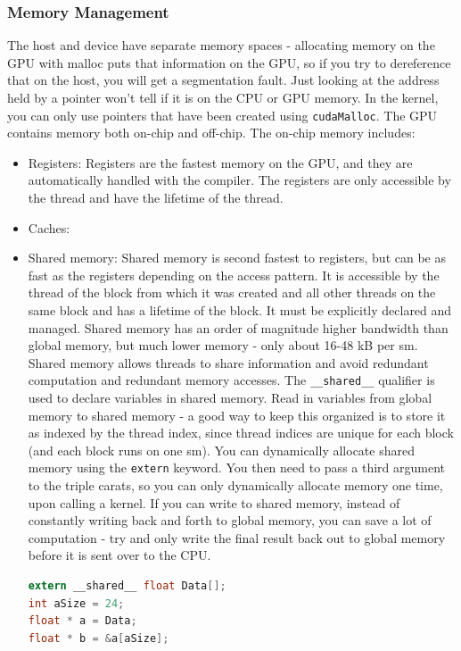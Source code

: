 \documentclass[10pt]{article}
\begin{document}
\begin{flushleft}
\subsubsection{Memory Management}

The host and device have separate memory spaces - allocating memory on the GPU with malloc puts that information on the GPU, so if you try to dereference that on the host, you will get a segmentation fault. Just looking at the address held by a pointer won't tell if it is on the CPU or GPU memory. In the kernel, you can only use pointers that have been created using {\tt cudaMalloc}. The GPU contains memory both on-chip and off-chip. The on-chip memory includes:

\begin{itemize}
\item Registers: Registers are the fastest memory on the GPU, and they are automatically handled with the compiler. The registers are only accessible by the thread and have the lifetime of the thread.
\item Caches:
\item Shared memory: Shared memory is second fastest to registers, but can be as fast as the registers depending on the access pattern. It is accessible by the thread of the block from which it was created and all other threads on the same block and has a lifetime of the block. It must be explicitly declared and managed. Shared memory has an order of magnitude higher bandwidth than global memory, but much lower memory - only about 16-48 kB per \gls{sm}. Shared memory allows threads to share information and avoid redundant computation and redundant memory accesses. The {\tt \_\_shared\_\_} qualifier is used to declare variables in shared memory. Read in variables from global memory to shared memory - a good way to keep this organized is to store it as indexed by the thread index, since thread indices are unique for each block (and each block runs on one \gls{sm}). You can dynamically allocate shared memory using the {\tt extern} keyword. You then need to pass a third argument to the triple carats, so you can only dynamically allocate memory one time, upon calling a kernel. If you can write to shared memory, instead of constantly writing back and forth to global memory, you can save a lot of computation - try and only write the final result back out to global memory before it is sent over to the CPU. 

\begin{lstlisting}[language=C]
extern __shared__ float Data[];
int aSize = 24;
float * a = Data;
float * b = &a[aSize];
\end{lstlisting}
\end{itemize}


\end{flushleft}
\end{document}
